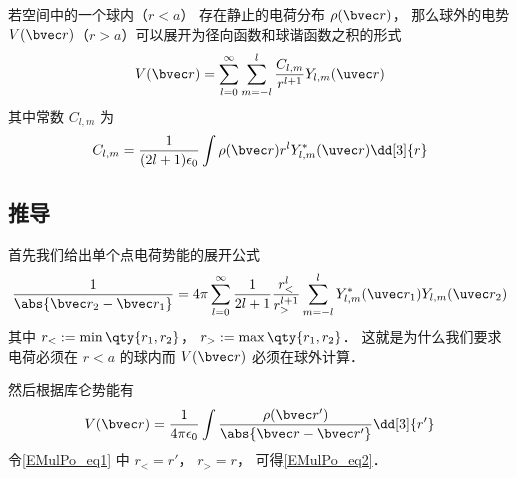 

若空间中的一个球内（$r < a$） 存在静止的电荷分布 $\rho(\bvec r)$， 那么球外的电势 $V(\bvec r)$（$r > a$）可以展开为径向函数和球谐函数之积的形式
\begin{equation}\label{EMulPo_eq2}
V(\bvec r) = \sum_{l = 0}^\infty \sum_{m = -l}^l \frac{C_{l,m}}{r^{l+1}} Y_{l,m}(\uvec r)
\end{equation}
其中常数 $C_{l,m}$ 为
\begin{equation}
C_{l,m} = \frac{1}{(2l+1)\epsilon_0} \int \rho(\bvec r) r^l Y_{l,m}^*(\uvec r) \dd[3]{r}
\end{equation}

\subsection{推导}
首先我们给出单个点电荷势能的展开公式
\begin{equation}\label{EMulPo_eq1}
\frac{1}{\abs{\bvec r_2 - \bvec r_1}} = 4\pi \sum_{l=0}^{\infty} \frac{1}{2l+1} \frac{r_<^l}{r_>^{l+1}} \sum_{m = -l}^l Y_{l,m}^*(\uvec r_1) Y_{l,m}(\uvec r_2)
\end{equation}
其中 $r_< := \min\qty{r_1, r_2}$， $r_> := \max\qty{r_1, r_2}$． 这就是为什么我们要求电荷必须在 $r < a$ 的球内而 $V(\bvec r)$ 必须在球外计算．

然后根据库仑势能有
\begin{equation}
V(\bvec r) = \frac{1}{4\pi\epsilon_0}\int \frac{\rho(\bvec r')}{\abs{\bvec r - \bvec r'}} \dd[3]{r'}
\end{equation}
令\autoref{EMulPo_eq1} 中 $r_< = r'$， $r_> = r$， 可得\autoref{EMulPo_eq2}．
